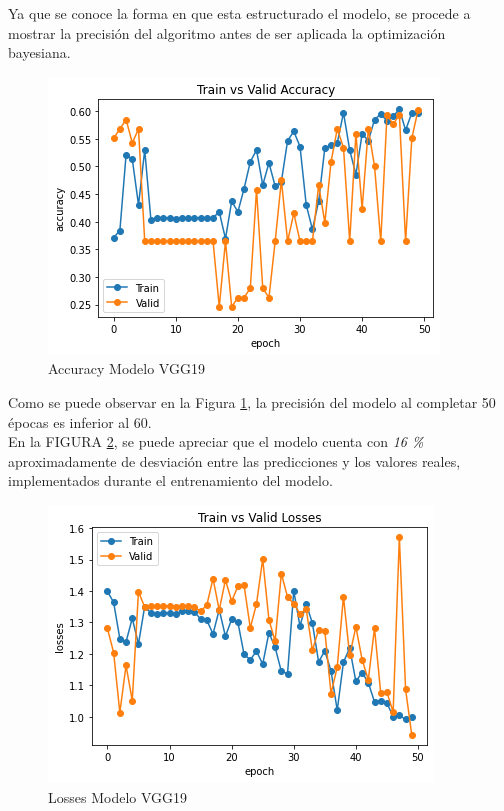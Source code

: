 				\newpage
				Ya que se conoce la forma en que esta estructurado el modelo, se procede a mostrar la precisión del algoritmo antes de ser aplicada la optimización bayesiana.
				
				\begin{figure}[ht]
					\centering
					\includegraphics[scale=0.55]{Figs/101.png}
					\caption{Accuracy Modelo VGG19}
					\label{fig:VGG19_accuracy}
				\end{figure}  
				
				Como se puede observar en la Figura \ref{fig:VGG19_accuracy}, la precisión del modelo al completar 50 épocas es inferior al 60.	\\
				
				En la FIGURA \ref{fig:VGG19_losses}, se puede apreciar que el modelo cuenta con \textit{16 \%} aproximadamente de desviación entre las predicciones y los valores reales, implementados durante el entrenamiento del modelo.
				
				\begin{figure}[ht]
					\centering
					\includegraphics[scale=0.55]{Figs/102.png}
					\caption{Losses Modelo VGG19}
					\label{fig:VGG19_losses}
				\end{figure}
			
